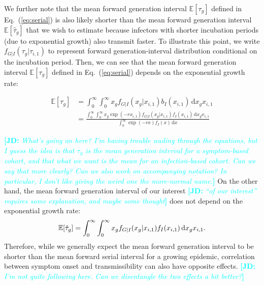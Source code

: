 \documentclass[12pt]{article}
\newcommand{\comment}{\showcomment}
\newcommand{\showcomment}[3]{\textcolor{#1}{\textbf{[#2: }\textsl{#3}\textbf{]}}}
\newcommand{\jd}[1]{\comment{cyan}{JD}{#1}}
\newcommand{\eref}[1]{Eq.~(\ref{eq:#1})}
\newcommand{\dd}[1]{\ensuremath{\, \mathrm{d}#1}}
\newcommand{\dx}{\dd{x}}
\begin{document}
We further note that the mean forward generation interval $\mathbb E[\tau_{g}]$ defined in \eref{serial} is also likely shorter than the mean forward generation interval $\mathbb E[\hat{\tau}_{g}]$ that we wish to estimate because infectors with shorter incubation periods (due to exponential growth) also transmit faster.
To illustrate this point, we write $f_{G|I}(\tau_g|\tau_{i,1})$ to represent forward generation-interval distribution conditional on the incubation period.
Then, we can see that the mean forward generation interval $\mathbb E[\tau_{g}]$ defined in \eref{serial} depends on the exponential growth rate:

\begin{align}
\mathbb E[\tau_{g}] &= \int_0^\infty \int_0^\infty x_g f_{G|I}(x_g|x_{i,1}) b_I(x_{i,1}) \dd x_g x_{i, 1}\\
&= \frac{\int_0^\infty \int_0^\infty x_g \exp(-rx_{i,1})  f_{G|I}(x_g|x_{i,1}) f_I(x_{i,1}) \dd x_g x_{i, 1}}{\int_0^\infty  \exp(-r x) f_I(x) \dx}
\end{align}

\jd{What's going on here? I'm having trouble wading through the equations, but I guess the idea is that $\tau_g$ is the mean generation interval for a symptom-based cohort, and that what we want is the mean for an infection-based cohort. Can we say that more clearly? Can we also work on accompanying notation? In particular, I don't like giving the weird one the more-normal name.}
On the other hand, the mean forward generation interval of our interest \jd{“of our interest” requires some explanation, and maybe some thought} does not depend on the exponential growth rate:
\begin{equation}
\mathbb E[\hat{\tau}_{g}] = \int_0^\infty \int_0^\infty x_g f_{G|I}(x_g|x_{i,1}) f_I(x_{i,1}) \dd x_g x_{i, 1}.\\
\label{eq:meangen}
\end{equation}
Therefore, while we generally expect the mean forward generation interval to be shorter than the mean forward serial interval for a growing epidemic, correlation between symptom onset and transmissibility can also have opposite effects.
\jd{I'm not quite following here. Can we disentangle the two effects a bit better?}
\end{document}
